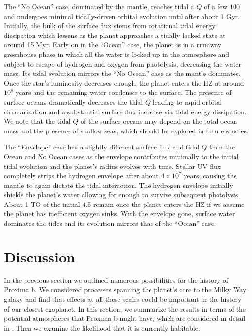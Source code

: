 \documentclass[preprint,12pt]{aastex}
\begin{document}
The ``No Ocean'' case, dominated by the mantle, reaches tidal a $Q$ of a few
$100$ and undergoes minimal tidally-driven orbital evolution until
after about 1 Gyr.  Initially, the bulk of the surface flux stems from
rotational tidal energy dissipation which lessens as the planet
approaches a tidally locked state at around 15 Myr. Early on in the
``Ocean'' case, the planet is in a runaway greenhouse phase in which all
the water is locked up in the atmosphere and subject to escape of
hydrogen and oxygen from photolysis, decreasing the water mass.  Its
tidal evolution mirrors the ``No Ocean'' case as the mantle dominates.
Once the star's luminosity decreases enough, the planet enters the HZ
at around $10^8$ years and the remaining water condenses to the
surface. The presence of surface oceans dramatically decreases the
tidal $Q$ leading to rapid orbital circularization and a substantial
surface flux increase via tidal energy dissipation.
We note that the tidal $Q$ of the surface oceans may depend on the 
total ocean mass and the presence of shallow seas, which should be explored in 
future studies.

The ``Envelope'' case has a slightly different surface flux and tidal $Q$
than the Ocean and No Ocean cases as the envelope contributes
minimally to the initial tidal evolution and the planet's radius
evolves with time.  Stellar UV flux completely strips the
hydrogen envelope after about $4 \times 10^7$ years, causing the mantle
to again dictate the tidal interaction.  The hydrogen envelope
initially shields the planet's water allowing for enough to survive
subsequent photolysis. About 1 TO of the initial 4.5
remain once the planet enters the HZ if we assume the planet has
inefficient oxygen sinks.  With the envelope gone, surface water
dominates the tides and its evolution mirrors that of the ``Ocean'' case.

\section{Discussion\label{sec:disc}}

In the previous section we outlined numerous possibilities for the
history of Proxima b. We considered processes spanning the planet's
core to the Milky Way galaxy and find that effects at all these scales
could be important in the history of our closest exoplanet. In this
section, we summarize the results in terms of the potential
atmospheres that Proxima b might have, which are considered in
detail in \citep{Meadows16}. Then we examine the likelihood that it is
currently habitable.
\end{document}
